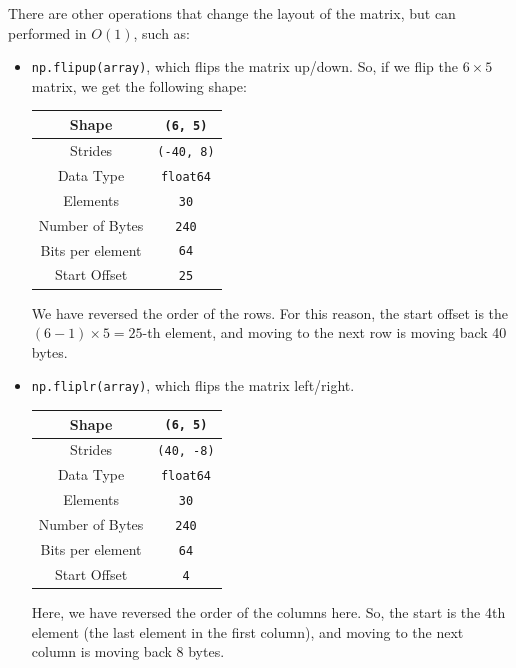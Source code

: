 \documentclass[a4paper, openany]{memoir}
\begin{document}
    There are other operations that change the layout of the matrix, but can performed in $O(1)$, such as:
    \begin{itemize}
        \item \texttt{np.flipup(array)}, which flips the matrix up/down. So, if we flip the $6 \times 5$ matrix, we get the following shape:
        \begin{table}[H]
            \centering
            \begin{tabular}{|c|c|}
                \hline
                Shape & \texttt{(6, 5)} \\
                \hline
                Strides & \texttt{(-40, 8)} \\
                \hline
                Data Type & \texttt{float64} \\
                \hline
                Elements & \texttt{30} \\
                \hline
                Number of Bytes & \texttt{240} \\
                \hline
                Bits per element & \texttt{64} \\
                \hline
                Start Offset & \texttt{25} \\
                \hline
            \end{tabular}
        \end{table}
        We have reversed the order of the rows. For this reason, the start offset is the $(6-1) \times 5 = 25$-th element, and moving to the next row is moving back 40 bytes.
        
        \item \texttt{np.fliplr(array)}, which flips the matrix left/right.
        \begin{table}[H]
            \centering
            \begin{tabular}{|c|c|}
                \hline
                Shape & \texttt{(6, 5)} \\
                \hline
                Strides & \texttt{(40, -8)} \\
                \hline
                Data Type & \texttt{float64} \\
                \hline
                Elements & \texttt{30} \\
                \hline
                Number of Bytes & \texttt{240} \\
                \hline
                Bits per element & \texttt{64} \\
                \hline
                Start Offset & \texttt{4} \\
                \hline
            \end{tabular}
        \end{table}
        Here, we have reversed the order of the columns here. So, the start is the 4th element (the last element in the first column), and moving to the next column is moving back 8 bytes.


\end{itemize}
\end{document}
